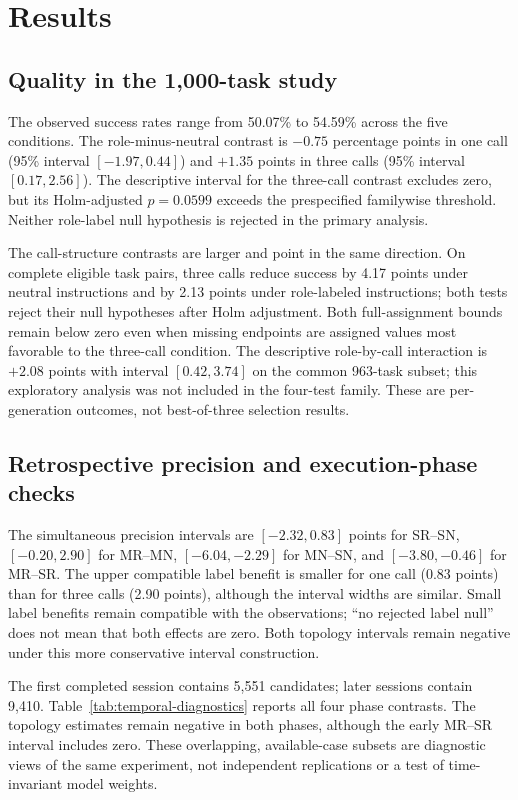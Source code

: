 \section{Results}
\aieditnote
\subsection{Quality in the 1,000-task study}
The observed success rates range from 50.07\% to 54.59\% across the five conditions. The role-minus-neutral contrast is $-0.75$ percentage points in one call (95\% interval $[-1.97,0.44]$) and $+1.35$ points in three calls (95\% interval $[0.17,2.56]$). The descriptive interval for the three-call contrast excludes zero, but its Holm-adjusted $p=0.0599$ exceeds the prespecified familywise threshold. Neither role-label null hypothesis is rejected in the primary analysis.

The call-structure contrasts are larger and point in the same direction. On complete eligible task pairs, three calls reduce success by 4.17 points under neutral instructions and by 2.13 points under role-labeled instructions; both tests reject their null hypotheses after Holm adjustment. Both full-assignment bounds remain below zero even when missing endpoints are assigned values most favorable to the three-call condition. The descriptive role-by-call interaction is $+2.08$ points with interval $[0.42,3.74]$ on the common 963-task subset; this exploratory analysis was not included in the four-test family. These are per-generation outcomes, not best-of-three selection results.




\subsection{Retrospective precision and execution-phase checks}
The simultaneous precision intervals are $[-2.32,0.83]$ points for SR--SN, $[-0.20,2.90]$ for MR--MN, $[-6.04,-2.29]$ for MN--SN, and $[-3.80,-0.46]$ for MR--SR. The upper compatible label benefit is smaller for one call (0.83 points) than for three calls (2.90 points), although the interval widths are similar. Small label benefits remain compatible with the observations; ``no rejected label null'' does not mean that both effects are zero. Both topology intervals remain negative under this more conservative interval construction.

The first completed session contains 5,551 candidates; later sessions contain 9,410. Table~\ref{tab:temporal-diagnostics} reports all four phase contrasts. The topology estimates remain negative in both phases, although the early MR--SR interval includes zero. These overlapping, available-case subsets are diagnostic views of the same experiment, not independent replications or a test of time-invariant model weights.

